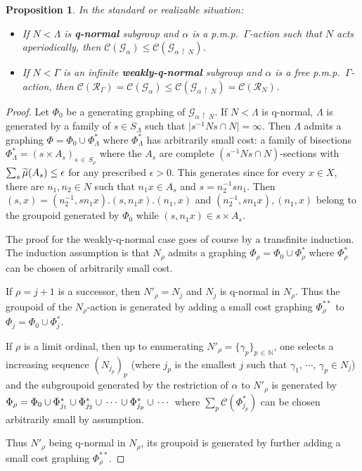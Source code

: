 \documentclass[10pt]{amsart}
\newtheorem{prop}[cdrthm]{Proposition}
\theoremstyle{definition}
\newcommand{\defin}[1]{\textbf{\emph{#1}}}
\newcommand{\Nmath}{\mathbb{N}}
\newcommand{\RR}{\mathcal{R}}
\newcommand{\cost}{\mathcal{C}}
\newcommand{\cg}{\mathcal{G}}
\newcommand{\pmp}{p.m.p.\ }
\let\oldtilde\tilde
\renewcommand*{\tilde}[1]{\mathchoice{\widetilde{#1}}{\widetilde{#1}}{\oldtilde{#1}}{\oldtilde{#1}}}
\begin{document}
\begin{prop}\label{prop:cost q-normal}
In the standard or realizable situation:
\begin{itemize}
\item[--]\label{prop3.2.1} If $N<\Lambda$ is \defin{q-normal} subgroup and $\alpha$ is a \pmp $\Gamma$-action such that $N$ acts aperiodically, then $\cost(\cg_{\alpha})\leq \cost(\cg_{\alpha\,\upharpoonright\,N})$.
\item[--]\label{prop3.2.2} If $N<\Gamma$ is an infinite \defin{weakly-q-normal} subgroup and $\alpha$ is a free \pmp $\Gamma$-action, then $\cost(\RR_\Gamma)= \cost(\cg_{\alpha})\leq \cost(\cg_{\alpha\,\upharpoonright\,N})=\cost(\RR_N)$.
\end{itemize}
\end{prop}



\begin{proof}
Let $\Phi_0$ be a generating graphing of $\cg_{\alpha\,\upharpoonright\,N}$. If $N<\Lambda$ is q-normal, $\Lambda$ is generated by a family of $s\in S_\Lambda$ such that $\vert s^{-1} N s \cap N\vert=\infty$. Then $\Lambda$ admits a graphing $\Phi=\Phi_0\cup \Phi_{\Lambda}^*$ where $\Phi_{\Lambda}^*$ has arbitrarily small cost: a family of bisections $\Phi_{\Lambda}^{*}=(s \times A_s)_{s\,\in\,S_\rho}$ where the $A_s$ are complete $\left(s^{-1} N s \cap N\right)$-sections with $\sum_s \tilde{\mu}(A_s)\linebreak\leq \epsilon$ for any prescribed $\epsilon>0$. This generates since for every $x\in X$, there are $n_1, n_2\in N$ such that $n_1 x\in A_s$ and $s=n_2^{-1}s n_1$. Then $(s,x)= (n_2^{-1}, sn_1 x). (s, n_1x). (n_1,x)$ and $(n_2^{-1}, sn_1 x), (n_1,x)$ belong to the groupoid generated by $\Phi_0$ while $(s, n_1x)\in s \times A_s$.


The proof for the weakly-q-normal case goes of course by a transfinite induction. The induction assumption is that $N_\rho$ admits a graphing $\Phi_\rho=\Phi_0\cup \Phi^*_\rho$ where $\Phi^*_\rho$ can be chosen of arbitrarily small cost.

If $\rho=j+1$ is a successor, then $N'_\rho=N_j$ and $N_j$ is q-normal in $N_\rho$. Thus the groupoid of the $N_\rho$-action is generated by adding a small cost graphing $\Phi^{**}_\rho$ to $\Phi_j=\Phi_0\cup \Phi^*_j$.

If $\rho$ is a limit ordinal, then up to enumerating $N'_\rho=\{\gamma_p\}_{p\,\in\,\Nmath}$, one selects a increasing sequence $(N_{j_p})_p$ (where $j_p$ is the smallest $j$ such that $\gamma_1,\,\cdots,\,\gamma_p\in N_j$) and the subgroupoid generated by the restriction of $\alpha$ to $N'_{\rho}$ is generated by $\Phi_\rho\linebreak=\Phi_0\cup \Phi^*_{j_1}\cup \Phi^*_{j_2}\cup\,\cdots\,\cup \Phi^*_{j_p}\cup\,\cdots$ where $\sum_p \cost(\Phi^*_{j_p})$ can be chosen arbitrarily small by assumption.

Thus $N'_\rho$ being q-normal in $N_\rho$, its groupoid is generated by further adding a small cost graphing $\Phi^{**}_\rho$.
\end{proof}
\end{document}
